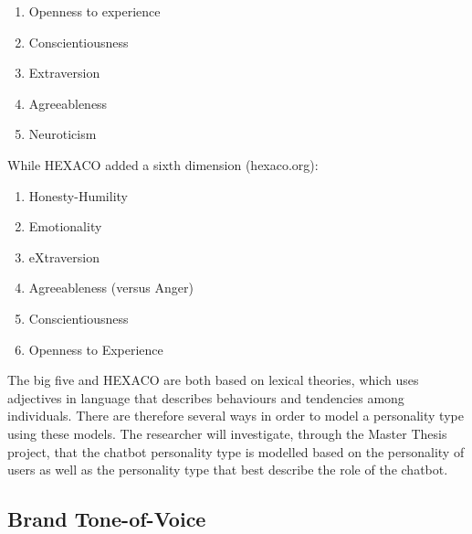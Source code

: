 \begin{enumerate}
    \item Openness to experience
    \item Conscientiousness
    \item Extraversion
    \item Agreeableness
    \item Neuroticism 
\end{enumerate}

While HEXACO added a sixth dimension (hexaco.org):
\begin{enumerate}
    \item Honesty-Humility
    \item Emotionality
    \item eXtraversion
    \item Agreeableness (versus Anger)
    \item Conscientiousness
    \item Openness to Experience
\end{enumerate}

The big five and HEXACO are both based on lexical theories, which uses adjectives in language that describes behaviours and tendencies among individuals. There are therefore several ways in order to model a personality type using these models. The researcher will investigate, through the Master Thesis project, that the chatbot personality type is modelled based on the personality of users as well as the personality type that best describe the role of the chatbot.

\subsection{Brand Tone-of-Voice}

